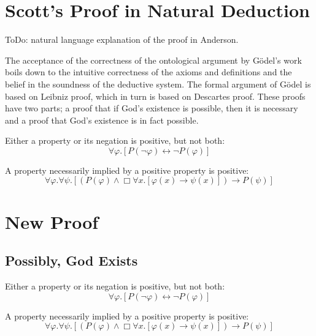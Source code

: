 \documentclass{llncs}
\newcommand{\imp}{\rightarrow}
\newcommand{\biimp}{\leftrightarrow}
\newcommand{\all}{\forall}
\newcommand{\nec}{\Box} %
\begin{document}
\section{Scott's Proof in Natural Deduction}

\setcounter{axiom}{0}
\setcounter{lemma}{0}
\setcounter{theorem}{0}
\setcounter{corollary}{0}

ToDo: natural language explanation of the proof in Anderson.

The acceptance of the correctness of the ontological argument by G\"odel's work boils down to the intuitive correctness of the axioms and definitions and the belief in the soundness of the deductive system. The formal argument of G\"odel is based on Leibniz proof, which in turn is based on Descartes proof. These proofs have two parts; a proof that if God's existence is possible, then it is necessary and a proof that God's existence is in fact possible. 


\begin{axiom}
\label{A1}
Either a property or its negation is positive, but not both:
$$
\all \varphi. [P(\neg \varphi) \biimp \neg P(\varphi)]
$$
\end{axiom}

\begin{axiom}
\label{A2}
A property necessarily implied by a positive property is positive:
$$
\all \varphi. \all \psi.[(P(\varphi) \wedge \nec \all x.[\varphi(x) \imp \psi(x)]) \imp P(\psi)]
$$
\end{axiom}


\section{New Proof}

\setcounter{axiom}{0}
\setcounter{lemma}{0}
\setcounter{theorem}{0}
\setcounter{corollary}{0}


\subsection{Possibly, God Exists}



\begin{axiom}
\label{A1}
Either a property or its negation is positive, but not both:
$$
\all \varphi. [P(\neg \varphi) \biimp \neg P(\varphi)]
$$
\end{axiom}

\begin{axiom}
\label{A2}
A property necessarily implied by a positive property is positive:
$$
\all \varphi. \all \psi.[(P(\varphi) \wedge \nec \all x.[\varphi(x) \imp \psi(x)]) \imp P(\psi)]
$$
\end{axiom}
\end{document}
